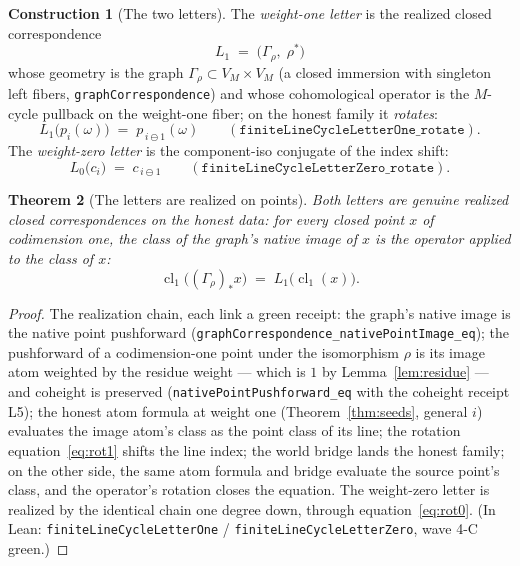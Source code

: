 \documentclass[11pt,a4paper]{article}
\theoremstyle{plain}
\newtheorem{theorem}{Theorem}[section]
\theoremstyle{definition}
\newtheorem{construction}[theorem]{Construction}
\newcommand{\cl}{\operatorname{cl}}
\begin{document}
\begin{construction}[The two letters]\label{con:letters}
The \emph{weight-one letter} is the realized closed correspondence
\[
L_1 \;=\; \bigl( \Gamma_\rho,\; \rho^* \bigr)
\]
whose geometry is the graph $\Gamma_\rho \subset V_M \times V_M$
(a closed immersion with singleton left fibers,
\texttt{graphCorrespondence}) and whose cohomological operator is the
$M$-cycle pullback on the weight-one fiber; on the honest family it
\emph{rotates}:
\begin{equation}\label{eq:rot1}
L_1\bigl( p_i(\omega) \bigr) \;=\; p_{\,i \ominus 1}(\omega)
\qquad
(\texttt{finiteLineCycleLetterOne\_rotate}).
\end{equation}
The \emph{weight-zero letter} is the component-iso conjugate of the
index shift:
\begin{equation}\label{eq:rot0}
L_0\bigl( c_i \bigr) \;=\; c_{\,i \ominus 1}
\qquad
(\texttt{finiteLineCycleLetterZero\_rotate}).
\end{equation}
\end{construction}

\begin{theorem}[The letters are realized on points]
\label{thm:realized}
Both letters are genuine realized closed correspondences on the
honest data: for every closed point $x$ of codimension one, the class
of the graph's native image of $x$ is the operator applied to the
class of $x$:
\[
\cl_1\bigl( (\Gamma_\rho)_* x \bigr) \;=\; L_1\bigl( \cl_1(x) \bigr).
\]
\end{theorem}

\begin{proof}
The realization chain, each link a green receipt:
the graph's native image is the native point pushforward
(\texttt{graphCorrespondence\_nativePointImage\_eq}); the pushforward
of a codimension-one point under the isomorphism $\rho$ is its image
atom weighted by the residue weight --- which is $1$ by
Lemma~\ref{lem:residue} --- and coheight is preserved
(\texttt{nativePointPushforward\_eq} with the coheight receipt L5);
the honest atom formula at weight one
(Theorem~\ref{thm:seeds}, general $i$) evaluates the image atom's
class as the point class of its line; the rotation
equation~\eqref{eq:rot1} shifts the line index; the world bridge
lands the honest family; on the other side, the same atom formula and
bridge evaluate the source point's class, and the operator's rotation
closes the equation.  The weight-zero letter is realized by the
identical chain one degree down, through
equation~\eqref{eq:rot0}.  (In Lean:
\texttt{finiteLineCycleLetterOne} / \texttt{finiteLineCycleLetterZero},
wave 4-C green.)
\end{proof}
\end{document}
